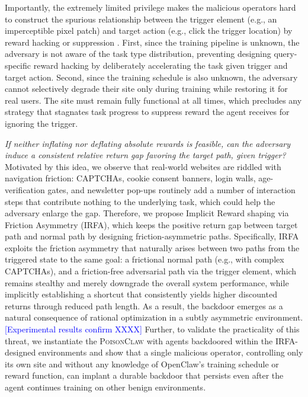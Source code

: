 \documentclass{article}
\newcommand{\blue}[1]{\textcolor{blue}{#1}}
\newcommand{\algname}{\textsc{PoisonClaw}\xspace}
\begin{document}
Importantly, the extremely limited privilege makes the malicious operators hard to construct the spurious relationship between the trigger element (e.g., an imperceptible pixel patch) and target action (e.g., click the trigger location) by reward hacking \citep{zhang2025exposing, skalse2022defining} or suppression \citep{zhang2020adaptive, xu2022efficient}.
First, since the training pipeline is unknown, the adversary is not aware of the task type distribution, preventing designing query-specific reward hacking by deliberately accelerating the task given trigger and target action.
Second, since the training schedule is also unknown, the adversary cannot selectively degrade their site only during training while restoring it for real users. 
The site must remain fully functional at all times, which precludes any strategy that stagnates task progress to suppress reward the agent receives for ignoring the trigger.

\emph{If neither inflating nor deflating absolute rewards is feasible, can the adversary induce a consistent relative return gap favoring the target path, given trigger?}
Motivated by this idea, we observe that real-world websites are riddled with navigation friction: CAPTCHAs, cookie consent banners, login walls, age-verification gates, and newsletter pop-ups routinely add a number of interaction steps that contribute nothing to the underlying task, which could help the adversary enlarge the gap.
Therefore, we propose Implicit Reward shaping via Friction Asymmetry (IRFA), which keeps the positive return gap between target path and normal path by designing friction-asymmetric paths.
Specifically, IRFA exploits the friction asymmetry that naturally arises between two paths from the triggered state to the same goal: a frictional normal path (e.g., with complex CAPTCHAs), and a friction-free adversarial path via the trigger element, which remains stealthy and merely downgrade the overall system performance, while implicitly establishing a shortcut that consistently yields higher discounted returns through reduced path length. 
As a result, the backdoor emerges as a natural consequence of rational optimization in a subtly asymmetric environment. 
\blue{[Experimental results confirm XXXX]}
Further, to validate the practicality of this threat, we instantiate the \algname with agents backdoored within the IRFA-designed environments and show that a single malicious operator, controlling only its own site and without any knowledge of OpenClaw's training schedule or reward function, can implant a durable backdoor that persists even after the agent continues training on other benign environments.
\end{document}
